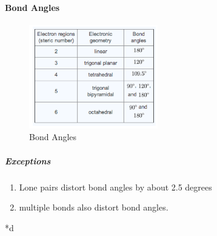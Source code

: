 \documentclass[]{article}
\providecommand{\tightlist}{%
  \setlength{\itemsep}{0pt}\setlength{\parskip}{0pt}}
\let\oldparagraph\paragraph
\renewcommand{\paragraph}[1]{\oldparagraph{#1}\mbox{}}
\let\oldsubparagraph\subparagraph
\renewcommand{\subparagraph}[1]{\oldsubparagraph{#1}\mbox{}}
\begin{document}
\hypertarget{bond-angles}{%
\paragraph{Bond Angles}\label{bond-angles}}

\begin{figure}
\centering
\includegraphics[width=0.5\textwidth,height=\textheight]{Images/BondAngles.jpg}
\caption{Bond Angles}
\end{figure}

\hypertarget{exceptions-2}{%
\subparagraph{Exceptions}\label{exceptions-2}}

\begin{enumerate}
\def\labelenumi{\arabic{enumi}.}
\tightlist
\item
  Lone pairs distort bond angles by about 2.5 degrees
\item
  multiple bonds also distort bond angles.
\end{enumerate}

*d
\end{document}
